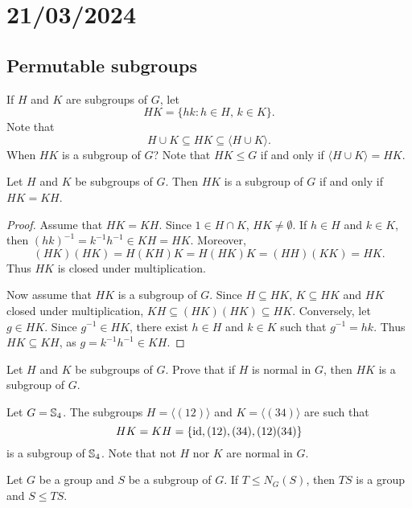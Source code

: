 \section{21/03/2024}

\subsection{Permutable subgroups}

If $H$ and $K$ are subgroups of $G$, let 
\[
        HK=\{hk:h\in H,\,k\in K\}.
\]
Note that 
\[
H\cup K\subseteq HK\subseteq\langle H\cup K\rangle.
\]
When $HK$ is a subgroup of $G$? 
Note that $HK\leq G$ if and only if $\langle H\cup K\rangle=HK$.

\begin{proposition}
        Let $H$ and $K$ be subgroups of $G$. Then $HK$ is a subgroup of
        $G$ if and only if $HK=KH$.
\end{proposition}

\begin{proof}
    Assume that $HK=KH$. Since $1\in H\cap K$, $HK\ne\emptyset$. 
    If $h\in H$ and $k\in K$, then $(hk)^{-1}=k^{-1}h^{-1}\in KH=HK$. Moreover, 
    \[
    (HK)(HK)=H(KH)K=H(HK)K=(HH)(KK)=HK.
    \]
    Thus $HK$ is closed under multiplication. 

    Now assume that $HK$ is a subgroup of $G$. Since $H\subseteq HK$,
    $K\subseteq HK$ and $HK$ closed under multiplication,
        $KH\subseteq (HK)(HK)\subseteq HK$. Conversely, let $g\in HK$.
        Since $g^{-1}\in HK$, there exist $h\in H$ and $k\in K$ such that
        $g^{-1}=hk$.
        Thus $HK\subseteq KH$, as 
        $g=k^{-1}h^{-1}\in KH$.
\end{proof}

\begin{exercise}
\label{xca:HK_normal}
Let $H$ and $K$ be subgroups of $G$. Prove that 
if $H$ is normal in $G$, then $HK$ is a subgroup of $G$.
\end{exercise}

\begin{example}
Let $G=\mathbb{S}_4$. The subgroups $H=\langle (12)\rangle$ and $K=\langle (34)\rangle$ are such that 
\[
HK=KH=\{
\operatorname{id},(12),(34),(12)(34)\}
\]
is a subgroup of 
$\mathbb{S}_4$. Note that not $H$ nor $K$
are normal in $G$.
\end{example}

\begin{exercise}
Let $G$ be a group and $S$ be a subgroup of $G$. 
If $T\leq N_G(S)$, then $TS$ is a group and $S\leq TS$.
\end{exercise}

